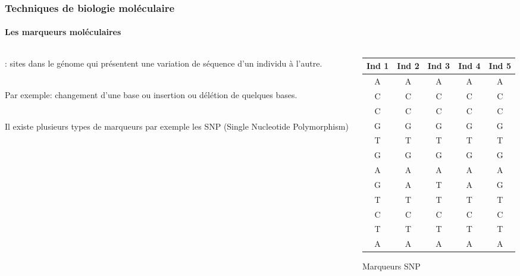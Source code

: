 \begin{frame}
\frametitle{Techniques de biologie moléculaire}
\framesubtitle{Les marqueurs moléculaires}

\begin{columns}
\begin{column}{.5\textwidth}
 : sites dans le génome qui présentent une variation de séquence d’un individu à l’autre.  \\

~\\\vfill

Par exemple: changement d’une base ou insertion ou délétion de quelques bases. \\

~\\\vfill

Il existe plusieurs types de marqueurs par exemple les SNP (Single Nucleotide Polymorphism)
\end{column}

\begin{column}{.5\textwidth}

\small

\begin{tabular}{ccccc}
\hline
Ind 1 & Ind 2 & Ind 3 & Ind 4 & Ind 5 \\
\hline
A & A & A & A & A \\
C & C & C & C & C \\
C & C & C & C & C \\
G & G & G & G & G \\ 
T &T & T & T & T \\
G & G & G & G & G \\
A & A & A & A & A \\
\cellcolor{mln-green} G & \cellcolor{mln-green} A & \cellcolor{mln-green} T & \cellcolor{mln-green} A & \cellcolor{mln-green} G \\ 
T &T & T & T & T \\
C & C & C & C & C \\
T &T & T & T & T \\
A & A & A & A & A \\
\hline
\end{tabular}
\centering\small Marqueurs SNP
\end{column}

\end{columns}

\end{frame}


